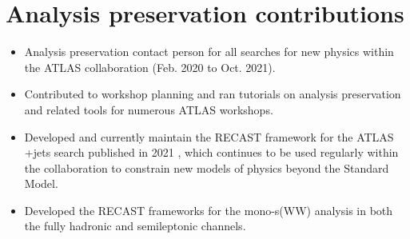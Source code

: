 \section*{Analysis preservation contributions}
\begin{itemize}
\item Analysis preservation contact person for all searches for new physics within the ATLAS collaboration (Feb. 2020 to Oct. 2021).
\begin{itemize}
\end{itemize}
\item Contributed to workshop planning and ran tutorials on analysis preservation and related tools for numerous ATLAS workshops.
\item Developed and currently maintain the RECAST framework for the ATLAS \met+jets search published in 2021 \cite{monojet_atlas_2021}, which continues to be used regularly within the collaboration to constrain new models of physics beyond the Standard Model.
\item Developed the RECAST frameworks for the mono-s(WW) analysis in both the fully hadronic and semileptonic channels.
\end{itemize}